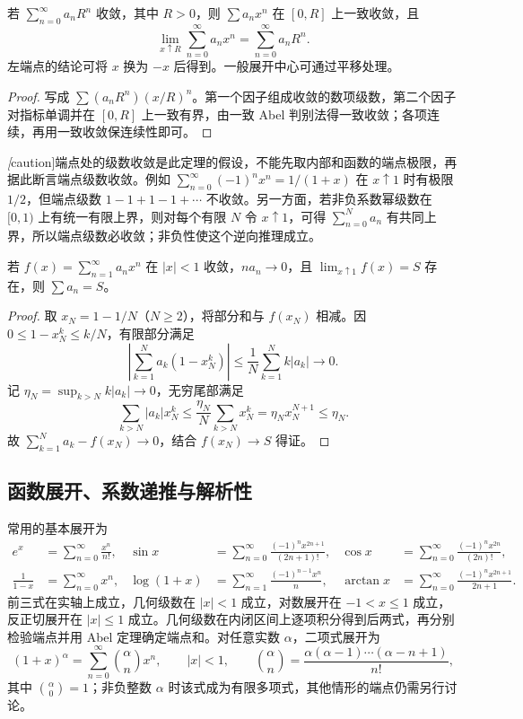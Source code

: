 \begin{theorem}
\label{thm:pei-abel-endpoint}
若 $\sum_{n=0}^{\infty}a_nR^n$ 收敛，其中 $R>0$，则 $\sum a_nx^n$ 在 $[0,R]$ 上一致收敛，且
\[
 \lim_{x\uparrow R}\sum_{n=0}^{\infty}a_nx^n
 =\sum_{n=0}^{\infty}a_nR^n.
\]
左端点的结论可将 $x$ 换为 $-x$ 后得到。一般展开中心可通过平移处理。
\end{theorem}
\begin{proof}
写成 $\sum (a_nR^n)(x/R)^n$。第一个因子组成收敛的数项级数，第二个因子对指标单调并在 $[0,R]$ 上一致有界，由一致 Abel 判别法得一致收敛；各项连续，再用一致收敛保连续性即可。
\end{proof}

\emph[caution]{端点处的级数收敛是此定理的假设，不能先取内部和函数的端点极限，再据此断言端点级数收敛。}例如 $\sum_{n=0}^{\infty}(-1)^nx^n=1/(1+x)$ 在 $x\uparrow1$ 时有极限 $1/2$，但端点级数 $1-1+1-1+\cdots$ 不收敛。另一方面，若非负系数幂级数在 $[0,1)$ 上有统一有限上界，则对每个有限 $N$ 令 $x\uparrow1$，可得 $\sum_{n=0}^{N}a_n$ 有共同上界，所以端点级数必收敛；非负性使这个逆向推理成立。

\begin{proposition}
若 $f(x)=\sum_{n=1}^{\infty}a_nx^n$ 在 $|x|<1$ 收敛，$na_n\to0$，且 $\lim_{x\uparrow1}f(x)=S$ 存在，则 $\sum a_n=S$。
\end{proposition}
\begin{proof}
取 $x_N=1-1/N$（$N\geq2$），将部分和与 $f(x_N)$ 相减。因 $0\leq1-x_N^k\leq k/N$，有限部分满足
\[
 \left|\sum_{k=1}^{N}a_k(1-x_N^k)\right|
 \leq\frac1N\sum_{k=1}^{N}k|a_k|\longrightarrow0.
\]
记 $\eta_N=\sup_{k>N}k|a_k|\to0$，无穷尾部满足
\[
 \sum_{k>N}|a_k|x_N^k
 \leq\frac{\eta_N}{N}\sum_{k>N}x_N^k
 =\eta_Nx_N^{N+1}\leq\eta_N.
\]
故 $\sum_{k=1}^{N}a_k-f(x_N)\to0$，结合 $f(x_N)\to S$ 得证。
\end{proof}

\subsection{函数展开、系数递推与解析性}

常用的基本展开为
\begin{align*}
 e^x&=\sum_{n=0}^{\infty}\frac{x^n}{n!},&
 \sin x&=\sum_{n=0}^{\infty}\frac{(-1)^nx^{2n+1}}{(2n+1)!},&
 \cos x&=\sum_{n=0}^{\infty}\frac{(-1)^nx^{2n}}{(2n)!},\\
 \frac1{1-x}&=\sum_{n=0}^{\infty}x^n,&
 \log(1+x)&=\sum_{n=1}^{\infty}\frac{(-1)^{n-1}x^n}{n},&
 \arctan x&=\sum_{n=0}^{\infty}\frac{(-1)^nx^{2n+1}}{2n+1}.
\end{align*}
前三式在实轴上成立，几何级数在 $|x|<1$ 成立，对数展开在 $-1<x\leq1$ 成立，反正切展开在 $|x|\leq1$ 成立。几何级数在内闭区间上逐项积分得到后两式，再分别检验端点并用 Abel 定理确定端点和。对任意实数 $\alpha$，二项式展开为
\[
 (1+x)^\alpha=\sum_{n=0}^{\infty}\binom\alpha n x^n,\qquad |x|<1,
 \qquad
 \binom\alpha n=\frac{\alpha(\alpha-1)\cdots(\alpha-n+1)}{n!},
\]
其中 $\binom\alpha0=1$；非负整数 $\alpha$ 时该式成为有限多项式，其他情形的端点仍需另行讨论。

